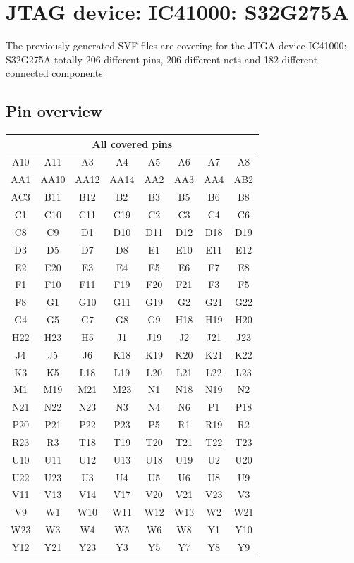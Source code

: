 \section{JTAG device: IC41000: S32G275A}
The previously generated SVF files are covering for the JTGA device IC41000: S32G275A totally 206 different pins, 206 different nets and 182 different connected components
\subsection{Pin overview}
 \begin{center} 
  \begin{longtable}{|c|c|c|c|c|c|c|c|} 
   \hline 
    \multicolumn{8}{|c|}{All covered pins}\\ 
   \hline 
    A10 & A11 & A3 & A4 & A5 & A6 & A7 & A8 \\ \hline 
    AA1 & AA10 & AA12 & AA14 & AA2 & AA3 & AA4 & AB2 \\ \hline 
    AC3 & B11 & B12 & B2 & B3 & B5 & B6 & B8 \\ \hline 
    C1 & C10 & C11 & C19 & C2 & C3 & C4 & C6 \\ \hline 
    C8 & C9 & D1 & D10 & D11 & D12 & D18 & D19 \\ \hline 
    D3 & D5 & D7 & D8 & E1 & E10 & E11 & E12 \\ \hline 
    E2 & E20 & E3 & E4 & E5 & E6 & E7 & E8 \\ \hline 
    F1 & F10 & F11 & F19 & F20 & F21 & F3 & F5 \\ \hline 
    F8 & G1 & G10 & G11 & G19 & G2 & G21 & G22 \\ \hline 
    G4 & G5 & G7 & G8 & G9 & H18 & H19 & H20 \\ \hline 
    H22 & H23 & H5 & J1 & J19 & J2 & J21 & J23 \\ \hline 
    J4 & J5 & J6 & K18 & K19 & K20 & K21 & K22 \\ \hline 
    K3 & K5 & L18 & L19 & L20 & L21 & L22 & L23 \\ \hline 
    M1 & M19 & M21 & M23 & N1 & N18 & N19 & N2 \\ \hline 
    N21 & N22 & N23 & N3 & N4 & N6 & P1 & P18 \\ \hline 
    P20 & P21 & P22 & P23 & P5 & R1 & R19 & R2 \\ \hline 
    R23 & R3 & T18 & T19 & T20 & T21 & T22 & T23 \\ \hline 
    U10 & U11 & U12 & U13 & U18 & U19 & U2 & U20 \\ \hline 
    U22 & U23 & U3 & U4 & U5 & U6 & U8 & U9 \\ \hline 
    V11 & V13 & V14 & V17 & V20 & V21 & V23 & V3 \\ \hline 
    V9 & W1 & W10 & W11 & W12 & W13 & W2 & W21 \\ \hline 
    W23 & W3 & W4 & W5 & W6 & W8 & Y1 & Y10 \\ \hline 
    Y12 & Y21 & Y23 & Y3 & Y5 & Y7 & Y8 & Y9 \\ \hline 
  \end{longtable} 
 \end{center}
